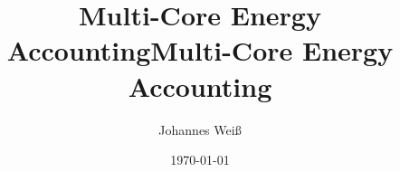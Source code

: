 \documentclass[a4paper]{scrreprt}
\title{Multi-Core Energy Accounting}
\begin{document}
\pagestyle{empty}

\title{Multi-Core Energy Accounting}
\author{Johannes Weiß\\
        }
\date{\today}
\maketitle
\thispagestyle{empty}
\pagestyle{empty}

\maketitle

\tableofcontents



















\end{document}
